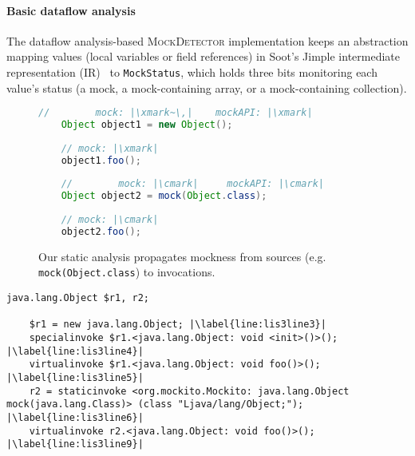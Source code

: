 \paragraph{Basic dataflow analysis} The dataflow analysis-based \textsc{MockDetector} implementation keeps an abstraction mapping values (local variables or field references) in Soot's Jimple intermediate representation (IR)~\cite{Vallee-Rai:1999:SJB:781995.782008} to \texttt{MockStatus}, which holds three bits monitoring each value's status (a mock, a mock-containing array, or a mock-containing collection). %

\begin{figure}[H]
\begin{lstlisting}[basicstyle=\ttfamily,
basicstyle=\scriptsize\ttfamily,language = Java, framesep=4.5mm, framexleftmargin=1.0mm, captionpos=b, escapechar=|, morekeywords={@Test}]
	//        mock: |\xmark~\,|    mockAPI: |\xmark|
	Object object1 = new Object();
	
	// mock: |\xmark|
	object1.foo();
	
	//        mock: |\cmark|     mockAPI: |\cmark|
	Object object2 = mock(Object.class);
	
	// mock: |\cmark|
	object2.foo();
\end{lstlisting}
    
    \caption{Our static analysis propagates mockness from sources (e.g. \texttt{mock(Object.class}) to invocations.}
    \label{fig:mockMethodIllustration}
    
\end{figure}

\begin{lstlisting}[basicstyle=\ttfamily, caption={Jimple Intermediate Representation for the code in Figure~\ref{fig:mockMethodIllustration}.},
basicstyle=\scriptsize\ttfamily, captionpos=b, label=lis:mockMethodIllustrationIR, escapechar=|, morekeywords={@Test, specialinvoke, virtualinvoke, staticinvoke}]
	java.lang.Object $r1, r2;
	
	$r1 = new java.lang.Object; |\label{line:lis3line3}|
	specialinvoke $r1.<java.lang.Object: void <init>()>(); |\label{line:lis3line4}|
	virtualinvoke $r1.<java.lang.Object: void foo()>(); |\label{line:lis3line5}|
	r2 = staticinvoke <org.mockito.Mockito: java.lang.Object mock(java.lang.Class)> (class "Ljava/lang/Object;"); |\label{line:lis3line6}|
	virtualinvoke r2.<java.lang.Object: void foo()>(); |\label{line:lis3line9}|
\end{lstlisting}


